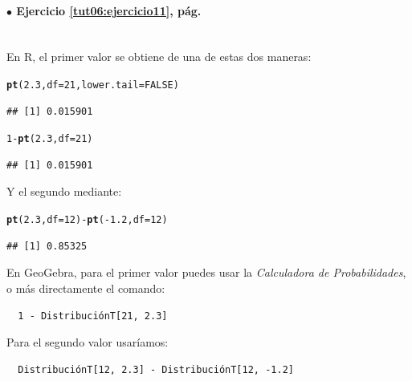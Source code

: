 \documentclass[10pt,a4paper]{article}\usepackage[]{graphicx}\usepackage[]{color}
\makeatletter
\newcommand{\hlnum}[1]{\textcolor[rgb]{0.686,0.059,0.569}{#1}}%
\newcommand{\hlopt}[1]{\textcolor[rgb]{0,0,0}{#1}}%
\newcommand{\hlstd}[1]{\textcolor[rgb]{0.345,0.345,0.345}{#1}}%
\newcommand{\hlkwc}[1]{\textcolor[rgb]{0.333,0.667,0.333}{#1}}%
\newcommand{\hlkwd}[1]{\textcolor[rgb]{0.737,0.353,0.396}{\textbf{#1}}}%
\newenvironment{kframe}{%
 \def\at@end@of@kframe{}%
 \ifinner\ifhmode%
  \def\at@end@of@kframe{\end{minipage}}%
  \begin{minipage}{\columnwidth}%
 \fi\fi%
 \def\FrameCommand##1{\hskip\@totalleftmargin \hskip-\fboxsep
 \colorbox{shadecolor}{##1}\hskip-\fboxsep
     \hskip-\linewidth \hskip-\@totalleftmargin \hskip\columnwidth}%
 \MakeFramed {\advance\hsize-\width
   \@totalleftmargin\z@ \linewidth\hsize
   \@setminipage}}%
 {\par\unskip\endMakeFramed%
 \at@end@of@kframe}
\newenvironment{knitrout}{}{} %
\makeatother
\begin{document}
\paragraph{\bf $\bullet$ Ejercicio \ref{tut06:ejercicio11}, pág. \pageref{tut06:ejercicio11}}
\label{tut06:ejercicio11:sol}\quad\\

En R, el primer valor se obtiene de una de estas dos maneras:
\begin{knitrout}
\color{fgcolor}\begin{kframe}
\begin{alltt}
\hlkwd{pt}\hlstd{(}\hlnum{2.3}\hlstd{,} \hlkwc{df}\hlstd{=}\hlnum{21}\hlstd{,} \hlkwc{lower.tail}\hlstd{=}\hlnum{FALSE}\hlstd{)}
\end{alltt}
\begin{verbatim}
## [1] 0.015901
\end{verbatim}
\begin{alltt}
\hlnum{1} \hlopt{-} \hlkwd{pt}\hlstd{(}\hlnum{2.3}\hlstd{,} \hlkwc{df}\hlstd{=}\hlnum{21}\hlstd{)}
\end{alltt}
\begin{verbatim}
## [1] 0.015901
\end{verbatim}
\end{kframe}
\end{knitrout}
Y el segundo mediante:
\begin{knitrout}
\color{fgcolor}\begin{kframe}
\begin{alltt}
\hlkwd{pt}\hlstd{(}\hlnum{2.3}\hlstd{,} \hlkwc{df}\hlstd{=}\hlnum{12}\hlstd{)} \hlopt{-} \hlkwd{pt}\hlstd{(}\hlopt{-}\hlnum{1.2}\hlstd{,} \hlkwc{df}\hlstd{=}\hlnum{12}\hlstd{)}
\end{alltt}
\begin{verbatim}
## [1] 0.85325
\end{verbatim}
\end{kframe}
\end{knitrout}


En GeoGebra, para el primer valor puedes usar la {\em Calculadora de Probabilidades}, o más directamente el comando:
\begin{verbatim}
  1 - DistribuciónT[21, 2.3]
\end{verbatim}
Para el segundo valor usaríamos:
\begin{verbatim}
  DistribuciónT[12, 2.3] - DistribuciónT[12, -1.2]
\end{verbatim}
\end{document}
